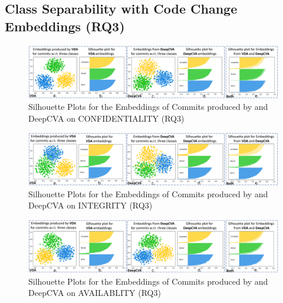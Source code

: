\subsection{\bf Class Separability with Code Change Embeddings (RQ3)}
\label{sec:separation}


\begin{figure}[t]
	\centering
	\includegraphics[width=6.9in]{graphs/confidentiality-1}
        \vspace{-6pt}
	\caption{Silhouette Plots for the Embeddings of Commits produced by {\tool} and DeepCVA on CONFIDENTIALITY (RQ3)}
	\label{fig:confidentiality}
\end{figure}

\begin{figure}[t]
	\centering
	\includegraphics[width=6.9in]{graphs/integrity-1}
        \vspace{-6pt}
	\caption{Silhouette Plots for the Embeddings of Commits produced by {\tool} and DeepCVA on INTEGRITY (RQ3)}
	\label{fig:integrity}
\end{figure}

\begin{figure}[t]
	\centering
	\includegraphics[width=6.9in]{graphs/availability-1}
       \vspace{-6pt}
	\caption{Silhouette Plots for the Embeddings of Commits produced by {\tool} and DeepCVA on AVAILABLITY (RQ3)}
	\label{fig:availability}
\end{figure}

